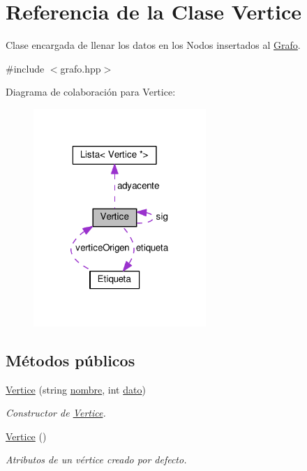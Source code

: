\hypertarget{classVertice}{}\section{Referencia de la Clase Vertice}
\label{classVertice}


Clase encargada de llenar los datos en los Nodos insertados al \hyperlink{classGrafo}{Grafo}.  




{\ttfamily \#include $<$grafo.\+hpp$>$}



Diagrama de colaboración para Vertice\+:\nopagebreak
\begin{figure}[H]
\begin{center}
\leavevmode
\includegraphics[width=185pt]{classVertice__coll__graph}
\end{center}
\end{figure}
\subsection*{Métodos públicos}
\begin{DoxyCompactItemize}
\item 
\hyperlink{classVertice_a7aff8f5bebd64a371708d72e12edc1dd}{Vertice} (string \hyperlink{classVertice_ab23a005b5c7802792ec2277227ba4d83}{nombre}, int \hyperlink{classVertice_accb96991da9db4ee82280acf2019d1dc}{dato})
\begin{DoxyCompactList}\small\item\em Constructor de \hyperlink{classVertice}{Vertice}. \end{DoxyCompactList}\item 
\mbox{\label{classVertice_a9dd7cf987cddf248b9d4e3d31bf8822b}} 
\hyperlink{classVertice_a9dd7cf987cddf248b9d4e3d31bf8822b}{Vertice} ()
\begin{DoxyCompactList}\small\item\em Atributos de un vértice creado por defecto. \end{DoxyCompactList}\end{DoxyCompactItemize}
